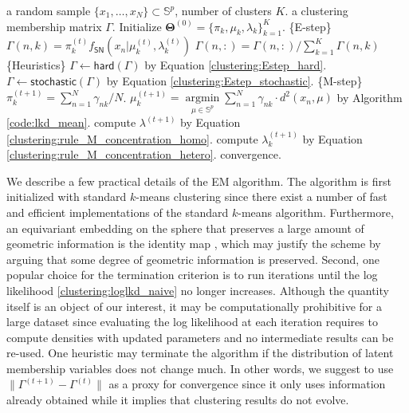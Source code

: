 \documentclass[11pt]{article}
\DeclareMathOperator*{\argmin}{argmin}
\newcommand{\bbS}{\mathbb{S}}
\newcommand{\bfTheta}{\mathbf{\Theta}}
\begin{document}
\begin{algorithm}[!t]
	\caption{EM algorithm for mixture of spherical normal distributions.}
	\label{code:em_spnorm}
	\begin{algorithmic}
		\REQUIRE a random sample $\lbrace x_1,\ldots,x_N\rbrace \subset \bbS^p$, number of clusters $K$.
		\ENSURE a clustering membership matrix $\Gamma$.		
		\STATE Initialize $ \bfTheta^{(0)} = \lbrace \pi_k, \mu_k, \lambda_k\rbrace_{k=1}^K$.
		\REPEAT 
			\STATE \{E-step\}
				\STATE $\Gamma (n,k)= \pi_k^{(t)} f_{\textsf{SN}} (x_n\vert \mu_k^{(t)}, \lambda_k^{(t)})$
				\ENDFOR
				\STATE $\Gamma(n,:) = \Gamma(n,:)/ \sum_{k=1}^K \Gamma(n,k)$
			\ENDFOR 
			\STATE \{Heuristics\}
				\STATE $\Gamma \leftarrow \textsf{hard}(\Gamma)$ by Equation \eqref{clustering:Estep_hard}.
				\STATE $\Gamma \leftarrow \textsf{stochastic}(\Gamma)$ by Equation \eqref{clustering:Estep_stochastic}.
			\ENDIF
			\STATE \{M-step\}
				\STATE $\pi_k^{(t+1)} = \sum_{n=1}^N \gamma_{nk} / N$.
				\STATE $\mu_k^{(t+1)} = \underset{\mu \in \bbS^p}{\argmin}  \sum_{n=1}^N \gamma_{nk} \cdot d^2 (x_n, \mu)$ by Algorithm \ref{code:lkd_mean}.
			\ENDFOR
				\STATE compute $\lambda^{(t+1)}$ by Equation \eqref{clustering:rule_M_concentration_homo}.
			\ELSE
					\STATE  compute $\lambda_k^{(t+1)}$ by Equation
					\eqref{clustering:rule_M_concentration_hetero}.
				\ENDFOR
			\ENDIF
		\UNTIL convergence.
	\end{algorithmic}
\end{algorithm}

We describe a few practical details of the EM algorithm. The algorithm is first initialized with standard $k$-means clustering \citep{macqueen_methods_1967, hornik_movmf_2014} since there exist a number of fast and efficient implementations of the standard $k$-means algorithm. Furthermore, an equivariant embedding on the sphere that preserves a large amount of geometric information is the identity map \citep{bhattacharya_nonparametric_2012-1}, which may justify the scheme by arguing that some degree of geometric information is preserved. Second, one popular choice for the termination criterion is to run iterations until the log likelihood \eqref{clustering:loglkd_naive} no longer increases. Although the quantity itself is an object of our interest, it may be computationally prohibitive for a large dataset since evaluating the log likelihood at each iteration requires to compute densities with updated parameters and no intermediate results can be re-used. One heuristic may terminate the algorithm if the distribution of latent membership variables does not change much. In other words, we suggest to use $\|\Gamma^{(t+1)} - \Gamma^{(t)}\|$ as a proxy for convergence since it only uses information already obtained while it implies that clustering results do not evolve. 
\end{document}
